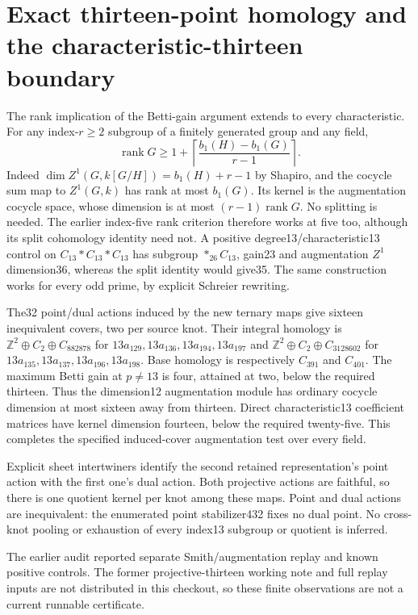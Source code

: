 \documentclass[11pt]{article}
\begin{document}
\section{Exact thirteen-point homology and the characteristic-thirteen boundary}

The rank implication of the Betti-gain argument extends to
every characteristic. For any index-$r\ge2$ subgroup of a
finitely generated group and any field,
\[
 \operatorname{rank}G\ge1+\left\lceil
       \frac{b_1(H)-b_1(G)}{r-1}\right\rceil.
\]
Indeed $\dim Z^1(G,k[G/H])=b_1(H)+r-1$ by Shapiro, and
the cocycle sum map to $Z^1(G,k)$ has rank at most $b_1(G)$.
Its kernel is the augmentation cocycle space, whose
dimension is at most $(r-1)\operatorname{rank}G$. No splitting is needed.
The earlier index-five rank criterion therefore works at
five too, although its split cohomology identity need not.
A positive degree13/characteristic13 control on
$C_{13}*C_{13}*C_{13}$ has subgroup $*_{26}C_{13}$,
gain23 and augmentation $Z^1$ dimension36, whereas the
split identity would give35. The same construction works
for every odd prime, by explicit Schreier rewriting.

The32 point/dual actions induced by the new ternary maps give
sixteen inequivalent covers, two per source knot. Their
integral homology is
$\mathbb Z^2\oplus C_2\oplus C_{882878}$ for
$13a_{129},13a_{136},13a_{194},13a_{197}$ and
$\mathbb Z^2\oplus C_2\oplus C_{3128602}$ for
$13a_{135},13a_{137},13a_{196},13a_{198}$.
Base homology is respectively $C_{391}$ and $C_{401}$.
The maximum Betti gain at $p\ne13$ is four, attained at two,
below the required thirteen. Thus the dimension12
augmentation module has ordinary cocycle dimension at most
sixteen away from thirteen. Direct characteristic13
coefficient matrices have kernel dimension fourteen, below
the required twenty-five. This completes the specified
induced-cover augmentation test over every field.

Explicit sheet intertwiners identify the second retained
representation's point action with the first one's dual
action. Both projective actions are faithful, so there is
one quotient kernel per knot among these maps. Point and
dual actions are inequivalent: the enumerated point
stabilizer432 fixes no dual point. No cross-knot pooling or
exhaustion of every index13 subgroup or quotient is inferred.

The earlier audit reported separate Smith/augmentation replay and known
positive controls. The former projective-thirteen working note and full
replay inputs are not distributed in this checkout, so these finite
observations are not a current runnable certificate.
\end{document}
